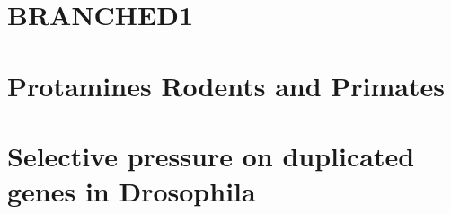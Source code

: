 

\section{BRANCHED1}

\section{Protamines Rodents and Primates}

\section{Selective pressure on duplicated genes in Drosophila}

